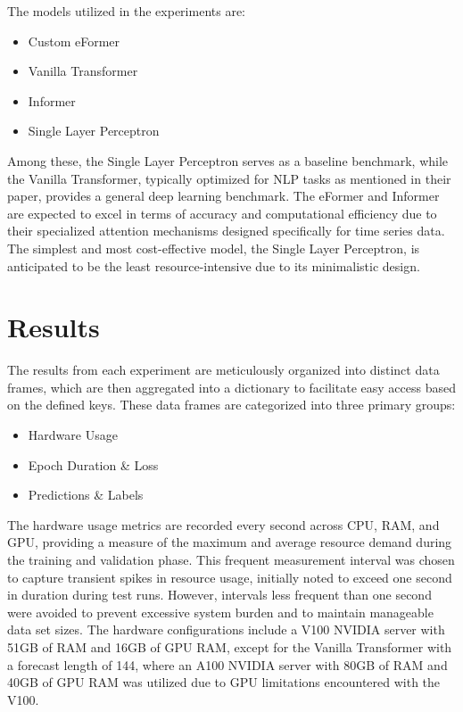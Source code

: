 \documentclass{article}
\begin{document}
The models utilized in the experiments are:
\begin{multicols}{2}
\begin{itemize}
    \item Custom eFormer
    \item Vanilla Transformer
    \item Informer
    \item Single Layer Perceptron
\end{itemize}
\end{multicols}

Among these, the Single Layer Perceptron serves as a baseline benchmark, while the Vanilla Transformer, typically optimized for NLP tasks as \cite{vanilla-transformer} mentioned in their paper, provides a general deep learning benchmark. The eFormer and Informer are expected to excel in terms of accuracy and computational efficiency due to their specialized attention mechanisms designed specifically for time series data. The simplest and most cost-effective model, the Single Layer Perceptron, is anticipated to be the least resource-intensive due to its minimalistic design.


\section{Results}

The results from each experiment are meticulously organized into distinct data frames, which are then aggregated into a dictionary to facilitate easy access based on the defined keys. These data frames are categorized into three primary groups:
\begin{multicols}{2}
\begin{itemize}
    \item Hardware Usage
    \item Epoch Duration \& Loss
    \item Predictions \& Labels
\end{itemize}
\end{multicols}

The hardware usage metrics are recorded every second across CPU, RAM, and GPU, providing a measure of the maximum and average resource demand during the training and validation phase. This frequent measurement interval was chosen to capture transient spikes in resource usage, initially noted to exceed one second in duration during test runs. However, intervals less frequent than one second were avoided to prevent excessive system burden and to maintain manageable data set sizes. The hardware configurations include a V100 NVIDIA server with 51GB of RAM and 16GB of GPU RAM, except for the Vanilla Transformer with a forecast length of 144, where an A100 NVIDIA server with 80GB of RAM and 40GB of GPU RAM was utilized due to GPU limitations encountered with the V100.
\end{document}
